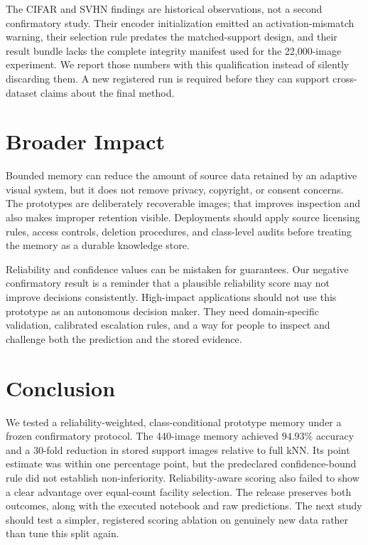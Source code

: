 \documentclass[10pt,twocolumn]{article}
\begin{document}
The CIFAR and SVHN findings are historical observations, not a second confirmatory
study. Their encoder initialization emitted an activation-mismatch warning, their
selection rule predates the matched-support design, and their result bundle lacks the
complete integrity manifest used for the 22,000-image experiment. We report those
numbers with this qualification instead of silently discarding them. A new registered
run is required before they can support cross-dataset claims about the final method.

\section{Broader Impact}

Bounded memory can reduce the amount of source data retained by an adaptive visual
system, but it does not remove privacy, copyright, or consent concerns. The prototypes
are deliberately recoverable images; that improves inspection and also makes improper
retention visible. Deployments should apply source licensing rules, access controls,
deletion procedures, and class-level audits before treating the memory as a durable
knowledge store.

Reliability and confidence values can be mistaken for guarantees. Our negative
confirmatory result is a reminder that a plausible reliability score may not improve
decisions consistently. High-impact applications should not use this prototype as an
autonomous decision maker. They need domain-specific validation, calibrated escalation
rules, and a way for people to inspect and challenge both the prediction and the stored
evidence.

\section{Conclusion}

We tested a reliability-weighted, class-conditional prototype memory under a frozen
confirmatory protocol. The 440-image memory achieved $94.93\%$ accuracy and a 30-fold
reduction in stored support images relative to full kNN. Its point estimate was within
one percentage point, but the predeclared confidence-bound rule did not establish
non-inferiority. Reliability-aware scoring also failed to show a clear advantage over
equal-count facility selection. The release preserves both outcomes, along with the
executed notebook and raw predictions. The next study should test a simpler, registered
scoring ablation on genuinely new data rather than tune this split again.
\end{document}
